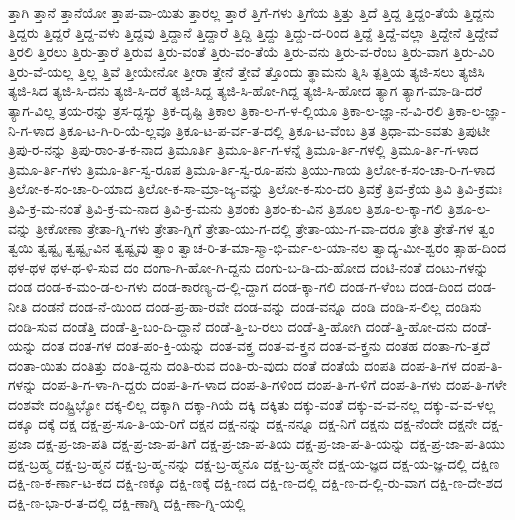 {ತ್ತಾಗಿ
ತ್ತಾನೆ
ತ್ತಾನೆಯೋ
ತ್ತಾಪ-ವಾ-ಯಿತು
ತ್ತಾರಲ್ಲ
ತ್ತಾರೆ
ತ್ತಿಗೆ-ಗಳು
ತ್ತಿಗೆಯ
ತ್ತಿತ್ತು
ತ್ತಿದೆ
ತ್ತಿದ್ದ
ತ್ತಿದ್ದಂ-ತೆಯೆ
ತ್ತಿದ್ದನು
ತ್ತಿದ್ದರು
ತ್ತಿದ್ದರೆ
ತ್ತಿದ್ದ-ವಳು
ತ್ತಿದ್ದವು
ತ್ತಿದ್ದಾನೆ
ತ್ತಿದ್ದಾರೆ
ತ್ತಿದ್ದಿ
ತ್ತಿದ್ದು
ತ್ತಿದ್ದು-ದ-ರಿಂದ
ತ್ತಿದ್ದೆ
ತ್ತಿದ್ದೆ-ವಲ್ಲಾ
ತ್ತಿದ್ದೇನೆ
ತ್ತಿದ್ದೇವೆ
ತ್ತಿರಲಿ
ತ್ತಿರಲು
ತ್ತಿರು-ತ್ತಾರೆ
ತ್ತಿರುವ
ತ್ತಿರು-ವಂತೆ
ತ್ತಿರು-ವಂ-ತೆಯೆ
ತ್ತಿರು-ವನು
ತ್ತಿರು-ವ-ರೆಂಬ
ತ್ತಿರು-ವಾಗ
ತ್ತಿರು-ವಿರಿ
ತ್ತಿರು-ವೆ-ಯಲ್ಲ
ತ್ತಿಲ್ಲ
ತ್ತಿವೆ
ತ್ತೀಯೇನೋ
ತ್ತೀರಾ
ತ್ತೇನೆ
ತ್ತೇವೆ
ತ್ತೊಂದು
ತ್ಥಾಮನು
ತ್ನಿಸಿ
ತ್ಪತ್ತಿಯ
ತ್ಯಜಿ-ಸಲು
ತ್ಯಜಿಸಿ
ತ್ಯಜಿ-ಸಿದ
ತ್ಯಜಿ-ಸಿ-ದನು
ತ್ಯಜಿ-ಸಿ-ದರೆ
ತ್ಯಜಿ-ಸಿದ್ದ
ತ್ಯಜಿ-ಸಿ-ಹೋ-ಗಿದ್ದ
ತ್ಯಜಿ-ಸಿ-ಹೋದ
ತ್ಯಾಗ
ತ್ಯಾಗ-ಮಾ-ಡಿ-ದರೆ
ತ್ಯಾಗ-ವಿಲ್ಲ
ತ್ರಯ-ರನ್ನು
ತ್ರಸ-ದ್ದಸ್ಯು
ತ್ರಿಕ-ದೃಷ್ಟಿ
ತ್ರಿಕಾಲ
ತ್ರಿಕಾ-ಲ-ಗ-ಳ-ಲ್ಲಿಯೂ
ತ್ರಿಕಾ-ಲ-ಜ್ಞಾ-ನ-ವಿ-ರಲಿ
ತ್ರಿಕಾ-ಲ-ಜ್ಞಾ-ನಿ-ಗ-ಳಾದ
ತ್ರಿಕೂ-ಟ-ಗಿ-ರಿ-ಯೆ-ಲ್ಲವೂ
ತ್ರಿಕೂ-ಟ-ಪ-ರ್ವ-ತ-ದಲ್ಲಿ
ತ್ರಿಕೂ-ಟ-ವೆಂಬ
ತ್ರಿತ
ತ್ರಿಧಾ-ಮ-ಽವತು
ತ್ರಿಪುಟೀ
ತ್ರಿಪು-ರ-ನನ್ನು
ತ್ರಿಪು-ರಾಂ-ತ-ಕ-ನಾದ
ತ್ರಿಮೂರ್ತಿ
ತ್ರಿಮೂ-ರ್ತಿ-ಗ-ಳನ್ನೆ
ತ್ರಿಮೂ-ರ್ತಿ-ಗಳಲ್ಲಿ
ತ್ರಿಮೂ-ರ್ತಿ-ಗ-ಳಾದ
ತ್ರಿಮೂ-ರ್ತಿ-ಗಳು
ತ್ರಿಮೂ-ರ್ತಿ-ಸ್ವ-ರೂಪ
ತ್ರಿಮೂ-ರ್ತಿ-ಸ್ವ-ರೂ-ಪನು
ತ್ರಿಯು-ಗಾಯ
ತ್ರಿಲೋ-ಕ-ಸಂ-ಚಾ-ರಿ-ಗ-ಳಾದ
ತ್ರಿಲೋ-ಕ-ಸಂ-ಚಾ-ರಿ-ಯಾದ
ತ್ರಿಲೋ-ಕ-ಸಾ-ಮ್ರಾ-ಜ್ಯ-ವನ್ನು
ತ್ರಿಲೋ-ಕ-ಸುಂ-ದರಿ
ತ್ರಿವಕ್ರೆ
ತ್ರಿವ-ಕ್ರೆಯ
ತ್ರಿವಿ
ತ್ರಿವಿ-ಕ್ರಮಃ
ತ್ರಿವಿ-ಕ್ರ-ಮ-ನಂತೆ
ತ್ರಿವಿ-ಕ್ರ-ಮ-ನಾದ
ತ್ರಿವಿ-ಕ್ರ-ಮನು
ತ್ರಿಶಂಕು
ತ್ರಿಶಂ-ಕು-ವಿನ
ತ್ರಿಶೂಲ
ತ್ರಿಶೂ-ಲ-ಕ್ಕಾ-ಗಲಿ
ತ್ರಿಶೂ-ಲ-ವನ್ನು
ತ್ರೀಕೋಣಾ
ತ್ರೇತಾ-ಗ್ನಿ-ಗಳು
ತ್ರೇತಾ-ಗ್ನಿಗೆ
ತ್ರೇತಾ-ಯು-ಗ-ದಲ್ಲಿ
ತ್ರೇತಾ-ಯು-ಗ-ವಾ-ದರೂ
ತ್ರೇತಿ
ತ್ರೇತೆ-ಗಳ
ತ್ವಂ
ತ್ವಯಿ
ತ್ವಷ್ಟೃ
ತ್ವಷ್ಟೃ-ವಿನ
ತ್ವಷ್ಟೃವು
ತ್ವಾಂ
ತ್ವಾಚ-ರಿ-ತ-ಮಾ-ಸ್ಮಾ-ಭಿ-ರ್ಮ-ಲ-ಯಾ-ನಲ
ತ್ವಾದ್ಯ-ಮೀ-ಶ್ವರಂ
ತ್ಸಾಹ-ದಿಂದ
ಥಳ-ಥಳ
ಥಳ-ಥ-ಳಿ-ಸುವ
ದಂ
ದಂಗಾ-ಗಿ-ಹೋ-ಗಿ-ದ್ದನು
ದಂಗು-ಬ-ಡಿ-ದು-ಹೋದ
ದಂಟಿ-ನಂತೆ
ದಂಟು-ಗಳನ್ನು
ದಂಡ
ದಂಡ-ಕ-ಮಂ-ಡ-ಲ-ಗಳು
ದಂಡ-ಕಾರಣ್ಯ-ದ-ಲ್ಲಿ-ದ್ದಾಗ
ದಂಡ-ಕ್ಕಾ-ಗಲಿ
ದಂಡ-ಗ-ಳೆಂಬ
ದಂಡ-ದಿಂದ
ದಂಡ-ನೀತಿ
ದಂಡನೆ
ದಂಡ-ನೆ-ಯಿಂದ
ದಂಡ-ಪ್ರ-ಹಾ-ರವೇ
ದಂಡ-ವನ್ನು
ದಂಡ-ವನ್ನೂ
ದಂಡಿ
ದಂಡಿ-ಸ-ಲಿಲ್ಲ
ದಂಡಿಸು
ದಂಡಿ-ಸುವ
ದಂಡೆತ್ತಿ
ದಂಡೆ-ತ್ತಿ-ಬಂ-ದಿ-ದ್ದಾನೆ
ದಂಡೆ-ತ್ತಿ-ಬ-ರಲು
ದಂಡೆ-ತ್ತಿ-ಹೋಗಿ
ದಂಡೆ-ತ್ತಿ-ಹೋ-ದನು
ದಂಡೆ-ಯನ್ನು
ದಂತ
ದಂತ-ಗಳ
ದಂತ-ಪಂ-ಕ್ತಿ-ಯನ್ನು
ದಂತ-ವಕ್ತ್ರ
ದಂತ-ವ-ಕ್ತ್ರನ
ದಂತ-ವ-ಕ್ತ್ರನು
ದಂತಹ
ದಂತಾ-ಗು-ತ್ತದೆ
ದಂತಾ-ಯಿತು
ದಂತಿತ್ತು
ದಂತಿ-ದ್ದನು
ದಂತಿ-ರುವ
ದಂತಿ-ರು-ವುದು
ದಂತೆ
ದಂತೆಯೆ
ದಂಪತಿ
ದಂಪ-ತಿ-ಗಳ
ದಂಪ-ತಿ-ಗಳನ್ನು
ದಂಪ-ತಿ-ಗ-ಳಾ-ಗಿ-ದ್ದರು
ದಂಪ-ತಿ-ಗ-ಳಾದ
ದಂಪ-ತಿ-ಗಳಿಂದ
ದಂಪ-ತಿ-ಗ-ಳಿಗೆ
ದಂಪ-ತಿ-ಗಳು
ದಂಪ-ತಿ-ಗಳೇ
ದಂಶವೇ
ದಂಷ್ಟ್ರಿಭ್ಯೋ
ದಕ್ಕ-ಲಿಲ್ಲ
ದಕ್ಕಾಗಿ
ದಕ್ಕಾ-ಗಿಯೆ
ದಕ್ಕಿ
ದಕ್ಕಿತು
ದಕ್ಕು-ವಂತೆ
ದಕ್ಕು-ವ-ವ-ನಲ್ಲ
ದಕ್ಕು-ವ-ವ-ಳಲ್ಲ
ದಕ್ಕೂ
ದಕ್ಕೆ
ದಕ್ಷ
ದಕ್ಷ-ಪ್ರ-ಸೂ-ತಿ-ಯ-ರಿಗೆ
ದಕ್ಷನ
ದಕ್ಷ-ನನ್ನು
ದಕ್ಷ-ನನ್ನೂ
ದಕ್ಷ-ನಿಗೆ
ದಕ್ಷನು
ದಕ್ಷ-ನೆಂದೇ
ದಕ್ಷನೇ
ದಕ್ಷ-ಪ್ರಜಾ
ದಕ್ಷ-ಪ್ರ-ಜಾ-ಪತಿ
ದಕ್ಷ-ಪ್ರ-ಜಾ-ಪ-ತಿಗೆ
ದಕ್ಷ-ಪ್ರ-ಜಾ-ಪ-ತಿಯ
ದಕ್ಷ-ಪ್ರ-ಜಾ-ಪ-ತಿ-ಯನ್ನು
ದಕ್ಷ-ಪ್ರ-ಜಾ-ಪ-ತಿಯು
ದಕ್ಷ-ಬ್ರಹ್ಮ
ದಕ್ಷ-ಬ್ರ-ಹ್ಮನ
ದಕ್ಷ-ಬ್ರ-ಹ್ಮ-ನನ್ನು
ದಕ್ಷ-ಬ್ರ-ಹ್ಮನೂ
ದಕ್ಷ-ಬ್ರ-ಹ್ಮನೇ
ದಕ್ಷ-ಯ-ಜ್ಞದ
ದಕ್ಷ-ಯ-ಜ್ಞ-ದಲ್ಲಿ
ದಕ್ಷಿಣ
ದಕ್ಷಿ-ಣ-ಕ-ರ್ಣಾ-ಟ-ಕದ
ದಕ್ಷಿ-ಣಕ್ಕೂ
ದಕ್ಷಿ-ಣಕ್ಕೆ
ದಕ್ಷಿ-ಣದ
ದಕ್ಷಿ-ಣ-ದಲ್ಲಿ
ದಕ್ಷಿ-ಣ-ದ-ಲ್ಲಿ-ರು-ವಾಗ
ದಕ್ಷಿ-ಣ-ದೇ-ಶದ
ದಕ್ಷಿ-ಣ-ಭಾ-ರ-ತ-ದಲ್ಲಿ
ದಕ್ಷಿ-ಣಾಗ್ನಿ
ದಕ್ಷಿ-ಣಾ-ಗ್ನಿ-ಯಲ್ಲಿ
}
